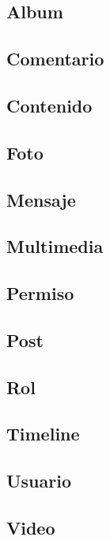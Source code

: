 \subsection{Album}

\subsection{Comentario}

\subsection{Contenido}

\subsection{Foto}

\subsection{Mensaje}

\subsection{Multimedia}

\subsection{Permiso}

\subsection{Post}

\subsection{Rol}

\subsection{Timeline}

\subsection{Usuario}

\subsection{Video}
